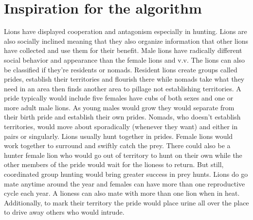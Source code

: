\section{Inspiration for the algorithm}
Lions have displayed cooperation and antagonism especially in hunting. Lions are also socially inclined meaning that they also organize information that other lions have collected and use them for their benefit.
Male lions have radically different social behavior and appearance than the female lions and v.v.
The lions can also be classified if they're residents or nomads. Resident lions create groups called prides, establish their territories and flourish there while nomads take what they need in an area then finds another area to pillage not establishing territories.
A pride typically would include five females have cubs of both sexes and one or more adult male lions.
As young males would grow they would separate from their birth pride and establish their own prides.
Nomads, who doesn't establish territories, would move about sporadically (whenever they want) and either in pairs or singularly.
Lions usually hunt together in prides. Female lions would work together to surround and swiftly catch the prey. There could also be a hunter female lion who would go out of territory to hunt on their own while the other members of the pride would wait for the lioness to return. But still, coordinated group hunting would bring greater success in prey hunts.
Lions do go mate anytime around the year and females can have more than one reproductive cycle each year. A lioness can also mate with more than one lion when in heat.
Additionally, to mark their territory the pride would place urine all over the place to drive away others who would intrude.

